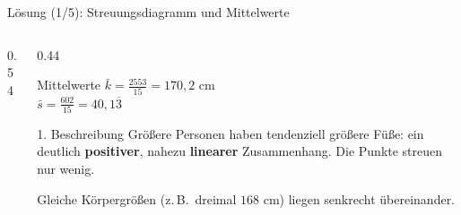 \documentclass[aspectratio=169,11pt]{beamer}
\newcommand{\koerperpunkte}{\addplot[only marks, mark=*, mark size=2.2pt, color=hsbiblue]
  coordinates {(164,39) (162,38) (168,39) (198,46) (166,40) (166,39) (192,45) (160,37) (151,36) (175,42) (180,43) (160,38) (168,41) (175,40) (168,39)};}
\begin{document}
\begin{frame}{Lösung (1/5): Streuungsdiagramm und Mittelwerte}
  \begin{columns}[T]
    \begin{column}{0.54\textwidth}
    \end{column}
    \begin{column}{0.44\textwidth}
      \small
      \begin{block}{Mittelwerte}
        $\bar{k} = \frac{2553}{15} = 170{,}2$ cm\\[3pt]
        $\bar{s} = \frac{602}{15} = 40{,}1\overline{3}$
      \end{block}
      \begin{exampleblock}{1. Beschreibung}
        Größere Personen haben tendenziell größere Füße: ein deutlich
        \textbf{positiver}, nahezu \textbf{linearer} Zusammenhang.
        Die Punkte streuen nur wenig.
      \end{exampleblock}
      \footnotesize Gleiche Körpergrößen (z.\,B.\ dreimal $168$ cm) liegen senkrecht
      übereinander.
    \end{column}
  \end{columns}
\end{frame}
\end{document}
